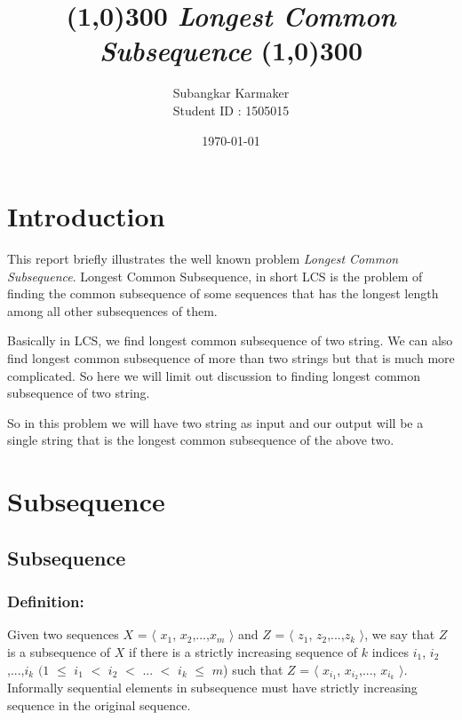\documentclass{report}
\title{
\line(1,0){300}
\endgraf\bigskip
\Huge
\emph{Longest Common Subsequence}
\newline
\line(1,0){300}
\bigskip
\bigskip
}
\author{
\Large{Subangkar Karmaker}\\
\Large{Student ID : 1505015}
}
\date{
\endgraf\bigskip
\Large{\today}
}
\begin{document}
\maketitle
\renewcommand{\familydefault}{\sfdefault}

\tableofcontents

\chapter{Introduction}
This report briefly illustrates the well known problem \textit{Longest Common Subsequence}. Longest Common Subsequence, in short LCS is the problem of finding the common subsequence of some sequences that has the longest length among all other subsequences of them.

\bigskip
Basically in LCS, we find longest common subsequence of two string. We can also find longest common subsequence of more than two strings but that is much more complicated. So here we will limit out discussion to finding longest common subsequence of two string.

\bigskip
So in this problem we will have two string as input and our output will be a single string that is the longest common subsequence of the above two.  
\newpage


\chapter{Subsequence}{\label{chap:subseq}}
\section{Subsequence}{
\bigskip
\subsection{Definition:}
Given two sequences $X$ = $\langle$ $x_1$, $x_2$,...,$x_m$ $\rangle$ and $Z$  = $\langle$ $z_1$, $z_2$,...,$z_k$ $\rangle$, we say that $Z$ is a subsequence of $X$ if there is a strictly increasing sequence of $k$ indices $i_1$, $i_2$,...,$i_k$  $(1$ $\leq$ $i_1$ $<$ $i_2$ $<$ ... $<$ $i_k$ $\leq$ $m$) such that $Z$ = $\langle$ $x_{i_1}$, $x_{i_2}$,..., $x_{i_k}$ $\rangle$.\\

Informally sequential elements in subsequence must have strictly increasing sequence in the original sequence.
\bigskip
}
\end{document}
